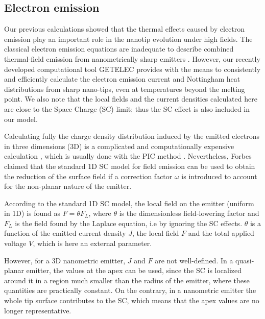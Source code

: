 \documentclass[%
 aps,
 prb,%
 amsmath,amssymb,
reprint,%
superscriptaddress,
]{revtex4-1}
\begin{document}
\subsection{Electron emission} \label{ssec:emission}

Our previous calculations \cite{Parviainen2011, Eimre2015} showed that the thermal effects caused by electron emission play an important role in the nanotip evolution under high fields.
The classical electron emission equations \cite{Schottky1923, FN1928, MurphyG} are inadequate to describe combined thermal-field emission \cite{Jensen2006} from nanometrically sharp emitters \cite{CutlerAPL, KXnonfn,KXGTF}. However, our recently developed computational tool GETELEC \cite{GETELECpaper} provides with the means to consistently and efficiently calculate the electron emission current and Nottingham heat distributions from sharp nano-tips, even at temperatures beyond the melting point.
We also note that the local fields and the current densities calculated here are close to the Space Charge (SC) limit; thus the SC effect \cite{Child_SC} is also included in our model. 

Calculating fully the charge density distribution induced by the emitted electrons in three dimensions (3D) is a complicated and computationally expensive calculation \cite{Jensen1999}, which is usually done with the PIC method \cite{chen2009space, Uimanov2011}.
Nevertheless, Forbes \cite{ForbesSpace} claimed that the standard 1D SC model for field emission \citep{BarbourSC} can be used to obtain the reduction of the surface field if a correction factor $\omega$ is introduced to account for the non-planar nature of the emitter. 

According to the standard 1D SC model, the local field on the emitter (uniform in 1D) is found as $F = \theta F_L$, where $\theta$ is the dimensionless field-lowering factor and $F_L$ is the field found by the Laplace equation, i.e by ignoring the SC effects.
$\theta$ is a function of the emitted current density $J$, the local field $F$ and the total applied voltage $V$, which is here an external parameter.

However, for a 3D nanometric emitter, $J$ and $F$ are not well-defined.
In a quasi-planar emitter, the values at the apex can be used, since the SC is localized around it in a region much smaller than the radius of the emitter, where these quantities are practically constant.
On the contrary, in a nanometric emitter the whole tip surface contributes to the SC, which means that the apex values are no longer representative. 
\end{document}
